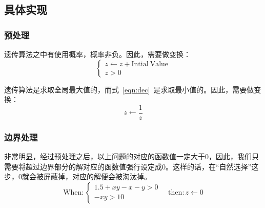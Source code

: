 \documentclass[12pt]{article}
\begin{document}
\subsection{具体实现}
\subsubsection{预处理}
遗传算法之中有使用概率，概率非负。因此，需要做变换：
\begin{equation}\left\{
\begin{array}{l}
z  \gets z + \mathrm{Intial~Value}\\
z>0
\end{array}\right.
\end{equation}\par
遗传算法是求取全局最大值的，而式~\eqref{eqn:dec}~是求取最小值的。因此，需要做变换：
\begin{equation}
z\gets \dfrac{1}{z}
\end{equation}
\subsubsection{边界处理}
非常明显，经过预处理之后，以上问题的对应的函数值一定大于0，因此，我们只需要将超过边界部分的解对应的函数值强行设定成0。这样的话，在“自然选择”这步，0就会被屏蔽掉，对应的解便会被淘汰掉。
\begin{equation}
\mathrm{When:}\left\{
\begin{array}{l}
1.5 + xy - x - y > 0\\
 - xy > 10
 \end{array}\right.
 \quad \mathrm{then:}
 z\gets 0
\end{equation}
\end{document}
